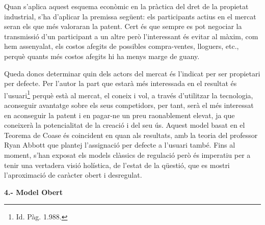 \documentclass[12pt]{article}
\begin{document}
\vspace{\baselineskip}
\begin{justify}
Quan s’aplica aquest esquema econòmic en la pràctica del dret de la propietat industrial, s’ha d’aplicar la premissa següent: els participants actius en el mercat seran els que més valoraran la patent. Cert és que sempre es pot negociar la transmissió d’un participant a un altre però l’interessant és evitar al màxim, com hem assenyalat, els costos afegits de possibles compra-ventes, lloguers, etc., perquè quants més costos afegits hi ha menys marge de guany.
\end{justify}\par


\vspace{\baselineskip}
\begin{justify}
Queda doncs determinar quin dels actors del mercat és l’indicat per ser propietari per defecte. Per l’autor la part que estarà més interessada en el resultat és l’usuari\footnote{ Id. Pàg. 1.988. } perquè està al mercat, el coneix i vol, a través d’utilitzar la tecnologia, aconseguir avantatge sobre els seus competidors, per tant, serà el més interessat en aconseguir la patent i en pagar-ne un preu raonablement elevat, ja que coneixerà la potencialitat de la creació i del seu ús.  Aquest model basat en el Teorema de Coase és coincident en quan als resultats, amb la teoria del professor Ryan Abbott que plantej l’assignació per defecte a l’usuari també. Fins al moment, s’han exposat els models clàssics de regulació però és imperatiu per a tenir una vertadera visió holística, de l’estat de la qüestió, que es mostri l’aproximació de caràcter obert i desregulat.
\end{justify}\par

\begin{justify}
\textbf{4.- Model Obert}
\end{justify}\par
\end{document}
